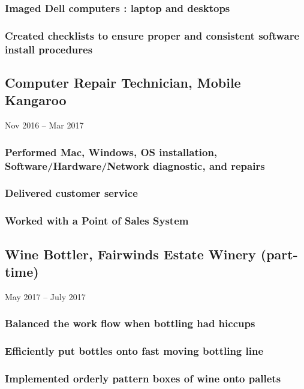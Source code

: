 \documentclass{article}
\begin{document}
    	\subsubsection{Imaged Dell computers : laptop and desktops }
    	\subsubsection{Created checklists to ensure proper and consistent software install procedures}
    	
    \subsection{Computer Repair Technician, Mobile Kangaroo} Nov 2016 – Mar 2017
        
        \vspace{-2mm}
        \subsubsection{Performed Mac, Windows, OS installation, Software/Hardware/Network diagnostic, and repairs}
    	\subsubsection{Delivered customer service}
    	\subsubsection{Worked with a Point of Sales System}
	\subsection{Wine Bottler, Fairwinds Estate Winery (part-time)} May 2017 – July 2017
		\vspace{-2mm}
		\subsubsection{Balanced the work flow when bottling had hiccups}
		\subsubsection{Efficiently put bottles onto fast moving bottling line}
		\subsubsection{Implemented orderly pattern boxes of wine onto pallets}
\end{document}
